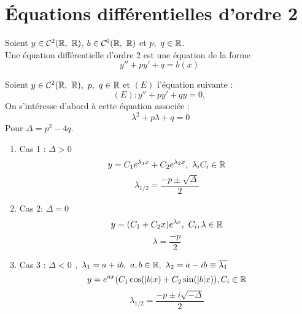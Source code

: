\section{\'Equations différentielles d'ordre 2}

\begin{definition}
	Soient $y \in \mathcal{C}^2(\R,\ \R)$, $b \in \mathcal{C}^0(\R,\ \R)$ et $p,\ q \in \mathbb{R}$. \\
	Une équation différentielle d'ordre 2 est une équation de la forme
	\[ y'' + py' + q = b(x) \]
\end{definition}

\begin{theorem}
  Soient $y \in \mathcal{C}^2(\R,\ \R),\ p,\ q \in \R$ et $(E)$ l'équation suivante :
  \[ (E) : y'' + py' + qy = 0, \]
  On s'intéresse d'abord à cette équation associée :
  \[ \ \lambda^{2} + p\lambda + q = 0 \]
  Pour $\Delta = p^2 - 4q$. 
  \begin{enumerate}
	\item Cas 1 :
		  $\Delta > 0$
		  \[ y = C_{1} e^{\lambda_{1} x} + C_{2} e^{\lambda_{2} x},\ \lambda_{i} C_{i} \in \mathbb{R} \]
        \[ \lambda_{1/2} = \frac{-p \pm \sqrt{\Delta}}{2} \]
	\item Cas 2:
		  $\Delta = 0$
		  \[ y = (C_{1} + C_{2}x) e^{\lambda x},\ C_{i}, \lambda \in \mathbb{R} \]
        \[ \lambda = \frac{-p}{2} \]
	\item Cas 3 :
		  $\Delta < 0$
		  $,\ \lambda_{1} = a + ib,\ a, b \in \R,\ \lambda_{2} = a - ib \equiv \overline{\lambda_{1}}$
		  \[ y = e^{ax}(C_1 \cos(\abs{b}x) + C_2 \sin(\abs{b}x)), C_i \in \mathbb{R} \]
        \[ \lambda_{1/2} = \frac{-p \pm i \sqrt{-\Delta}}{2} \]
  \end{enumerate}
\end{theorem}

